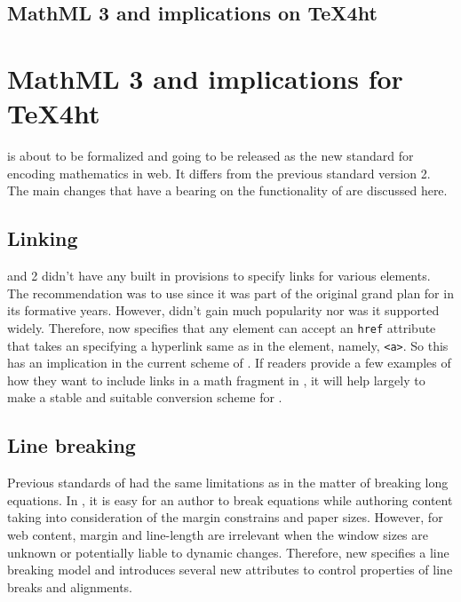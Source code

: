 \documentclass[a4paper]{article}
\begin{document}
\section{MathML 3 and implications on TeX4ht}
\else
\chapter{MathML 3 and implications for \TeX4ht}
\fi

\leavevmode {} is about to
be formalized and going to be released as the new standard for encoding
mathematics in web. It differs from the previous standard version 2. The
main changes that have a bearing on the functionality of
 are discussed here.

\section{Linking}

 and 2 didn't have any built in provisions to specify links for
various elements. The recommendation was to use
 since it was part of the
original grand plan for 
in its formative years. However, \xlink didn't gain much popularity nor
was it supported widely. Therefore,  now specifies that any
\mathml element can accept an \verb+href+ attribute that takes an \uri
specifying a hyperlink same as in the
 element,
namely, \verb+<a>+. So this has an implication in the current scheme of
\texht. If readers provide a few examples of how they want to include
links in a math fragment in \latex, it will help largely to make a
stable and suitable conversion scheme for \texht.

\section{Line breaking}

Previous standards of \mathml had the same limitations as \tex in the
matter of breaking long equations. In \tex, it is easy for an author to
break equations while authoring content taking into consideration of the
margin constrains and paper sizes. However, for web content, margin and
line-length are irrelevant when the window sizes are unknown or
potentially liable to dynamic changes. Therefore, new 
specifies a line breaking model and introduces several new attributes to
control properties of line breaks and alignments.
\end{document}
